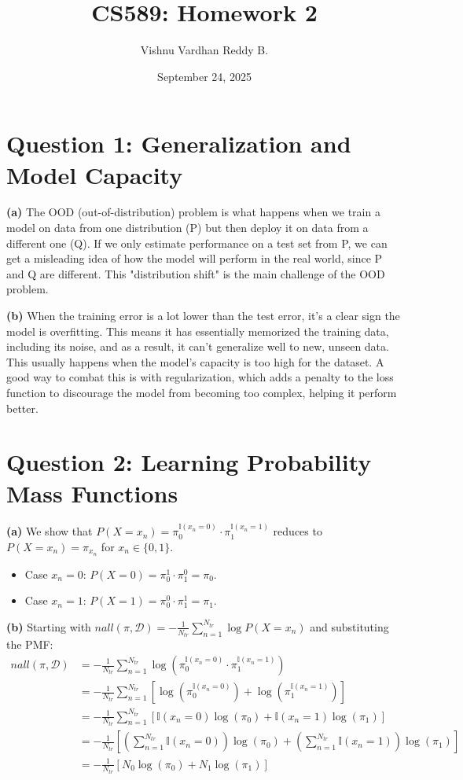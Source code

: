 \documentclass[11pt]{article}
\title{\textbf{CS589: Homework 2}}
\author{Vishnu Vardhan Reddy B.}
\date{September 24, 2025}
\begin{document}
\maketitle

\section*{Question 1: Generalization and Model Capacity}
\noindent\textbf{(a)} The OOD (out-of-distribution) problem is what happens when we train a model on data from one distribution (P) but then deploy it on data from a different one (Q). If we only estimate performance on a test set from P, we can get a misleading idea of how the model will perform in the real world, since P and Q are different. This "distribution shift" is the main challenge of the OOD problem.

\noindent\textbf{(b)} When the training error is a lot lower than the test error, it's a clear sign the model is overfitting. This means it has essentially memorized the training data, including its noise, and as a result, it can't generalize well to new, unseen data. This usually happens when the model's capacity is too high for the dataset. A good way to combat this is with regularization, which adds a penalty to the loss function to discourage the model from becoming too complex, helping it perform better.
\section*{Question 2: Learning Probability Mass Functions}
\noindent\textbf{(a)} We show that $P(X=x_{n})=\pi_{0}^{\mathbb{I}(x_{n}=0)}\cdot\pi_{1}^{\mathbb{I}(x_{n}=1)}$ reduces to $P(X=x_{n})=\pi_{x_{n}}$ for $x_n \in \{0, 1\}$.  
\begin{itemize}
    \item Case $x_n = 0$: $P(X=0) = \pi_{0}^{1} \cdot \pi_{1}^{0} = \pi_0$.
    \item Case $x_n = 1$: $P(X=1) = \pi_{0}^{0} \cdot \pi_{1}^{1} = \pi_1$.
\end{itemize}

\noindent\textbf{(b)} Starting with $nall(\pi, \mathcal{D}) = -\frac{1}{N_{tr}}\sum_{n=1}^{N_{tr}}\log P(X=x_{n})$ and substituting the PMF:
\begin{align*}
    nall(\pi, \mathcal{D}) &= -\frac{1}{N_{tr}}\sum_{n=1}^{N_{tr}}\log \left( \pi_{0}^{\mathbb{I}(x_{n}=0)}\cdot\pi_{1}^{\mathbb{I}(x_{n}=1)} \right) \\
    &= -\frac{1}{N_{tr}}\sum_{n=1}^{N_{tr}} \left[ \log\left(\pi_{0}^{\mathbb{I}(x_{n}=0)}\right) + \log\left(\pi_{1}^{\mathbb{I}(x_{n}=1)}\right) \right] \\
    &= -\frac{1}{N_{tr}}\sum_{n=1}^{N_{tr}} \left[ \mathbb{I}(x_{n}=0)\log(\pi_{0}) + \mathbb{I}(x_{n}=1)\log(\pi_{1}) \right] \\
    &= -\frac{1}{N_{tr}} \left[ \left(\sum_{n=1}^{N_{tr}}\mathbb{I}(x_{n}=0)\right)\log(\pi_{0}) + \left(\sum_{n=1}^{N_{tr}}\mathbb{I}(x_{n}=1)\right)\log(\pi_{1}) \right] \\
    &= -\frac{1}{N_{tr}} \left[ N_0 \log(\pi_0) + N_1 \log(\pi_1) \right]
\end{align*}
\end{document}
